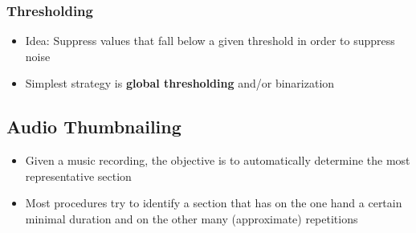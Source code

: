 \documentclass{scrartcl}
\begin{document}
\subsubsection*{Thresholding}
\begin{itemize}
    \item
        Idea: Suppress values that fall below a given threshold in order to suppress noise
    \item
        Simplest strategy is \textbf{global thresholding} and/or binarization
\end{itemize}

\subsection*{Audio Thumbnailing}
\begin{itemize}
    \item
        Given a music recording, the objective is to automatically determine the most representative section
    \item
        Most procedures try to identify a section that has on the one hand a certain minimal duration and on the other many (approximate) repetitions
\end{itemize}
\end{document}
